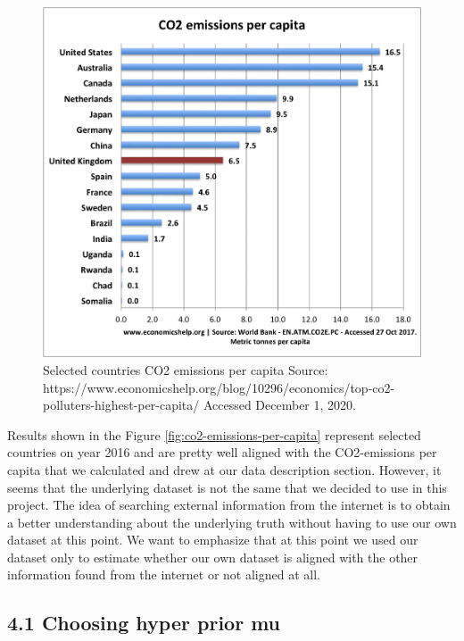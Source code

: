 \documentclass[
]{article}
\begin{document}
\begin{figure}
\includegraphics[width=1\linewidth]{co2-emissions-per-capita} \caption{\label{fig:co2-emissions-per-capita}Selected countries CO2 emissions per capita \newline Source: https://www.economicshelp.org/blog/10296/economics/top-co2-polluters-highest-per-capita/ \newline Accessed December 1, 2020.}\label{fig:co2-emissions-per-capit}
\end{figure}

Results shown in the Figure \ref{fig:co2-emissions-per-capita} represent
selected countries on year 2016 and are pretty well aligned with the
CO2-emissions per capita that we calculated and drew at our data
description section. However, it seems that the underlying dataset is
not the same that we decided to use in this project. The idea of
searching external information from the internet is to obtain a better
understanding about the underlying truth without having to use our own
dataset at this point. We want to emphasize that at this point we used
our dataset only to estimate whether our own dataset is aligned with the
other information found from the internet or not aligned at all.

\hypertarget{choosing-hyper-prior-mu}{%
\subsection{4.1 Choosing hyper prior mu}\label{choosing-hyper-prior-mu}}
\end{document}
